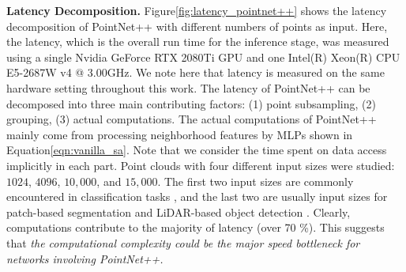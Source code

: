 \documentclass{article}
\newcommand{\figLabel}{Figure\xspace}
\newcommand{\eqnLabel}{Equation\xspace}
\newcommand{\mysection}[1]{\vspace{3pt}\noindent\textbf{#1.}}
\begin{document}
\mysection{Latency Decomposition} \figLabel\ref{fig:latency_pointnet++} shows the latency decomposition of PointNet++  \cite{Qi2017PointNetDH} with different numbers of points as input. Here, the latency, which is the overall run time for the inference stage, was measured using a single Nvidia GeForce RTX 2080Ti GPU and one Intel(R) Xeon(R) CPU E5-2687W v4 @ 3.00GHz. We note here that latency is measured on the same hardware setting throughout this work. 
The latency of PointNet++ can be decomposed into three main contributing factors: (1) point subsampling, (2) grouping, (3) actual computations. The actual computations of PointNet++ mainly come from processing neighborhood features by MLPs shown in \eqnLabel \ref{eqn:vanilla_sa}. Note that we consider the time spent on data access implicitly in each part. Point clouds with four different input sizes were studied: $1024$, $4096$, $10,000$, and $15,000$. The first two input sizes are commonly encountered in classification tasks \cite{ben20183dmfv}, and the last two are usually input sizes for patch-based segmentation \cite{Qi2017PointNetDH, Thomas2019KPConvFA} and LiDAR-based object detection \cite{Shi2019PointRCNN3O}. 
Clearly, computations contribute to the majority of latency (over 70 \%). This suggests that \textit{the computational complexity could be the major speed bottleneck for networks involving PointNet++. }
\end{document}
